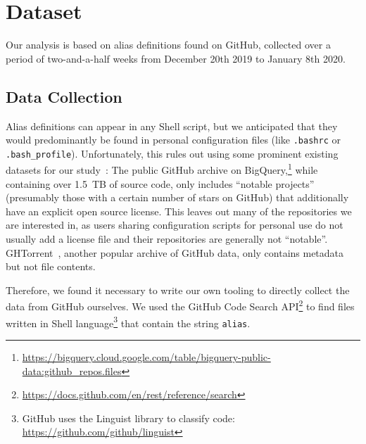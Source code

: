 \documentclass[sigconf,nonacm,screen]{acmart}
\newcommand{\num}[1]{\numprint{#1}}
\begin{document}
\section{Dataset}

Our analysis is based on \num{2204199} alias definitions found on GitHub, collected over a period of two-and-a-half weeks from December 20th 2019 to January 8th 2020.

\subsection{Data Collection}

Alias definitions can appear in any Shell script, but we anticipated that they would predominantly be found in personal configuration files (like \verb|.bashrc| or \verb|.bash_profile|).
Unfortunately, this rules out using some prominent existing datasets for our study~\citep{mombach}:
The public GitHub archive on BigQuery,\footnote{\url{https://bigquery.cloud.google.com/table/bigquery-public-data:github_repos.files}} while containing over 1.5~TB of source code, only includes ``notable projects'' (presumably those with a certain number of stars on GitHub) that additionally have an explicit open source license. 
This leaves out many of the repositories we are interested in, as users sharing configuration scripts for personal use do not usually add a license file and their repositories are generally not ``notable''.
GHTorrent~\citep{ghtorrent}, another popular archive of GitHub data, only contains metadata but not file contents.

Therefore, we found it necessary to write our own tooling to directly collect the data from GitHub ourselves.
We used the GitHub Code Search API\footnote{\url{https://docs.github.com/en/rest/reference/search}} to find files written in Shell language\footnote{GitHub uses the Linguist library to classify code: \url{https://github.com/github/linguist}} that contain the string \verb|alias|.
\end{document}
